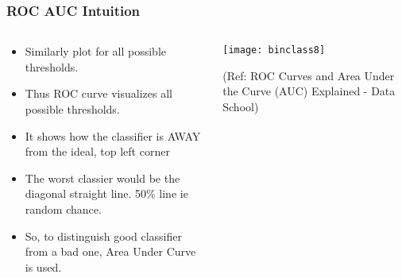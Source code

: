 \begin{frame}[fragile]\frametitle{ROC AUC Intuition}

\begin{columns}
\begin{column}[T]{0.5\linewidth}
\begin{itemize}
\item Similarly plot for all possible thresholds. 
\item Thus ROC curve visualizes all possible thresholds.
\item It shows how the classifier is AWAY from the ideal, top left corner
\item The worst classier would be the diagonal straight line.  50\% line ie random chance.
\item So, to distinguish good classifier from a bad one, Area Under Curve is used.
\end{itemize}
\end{column}
\begin{column}[T]{0.5\linewidth}

\begin{center}
\texttt{[image: binclass8]}
\end{center}

\tiny{(Ref: ROC Curves and Area Under the Curve (AUC) Explained - Data School)}
\end{column}

\end{columns}
\end{frame}


